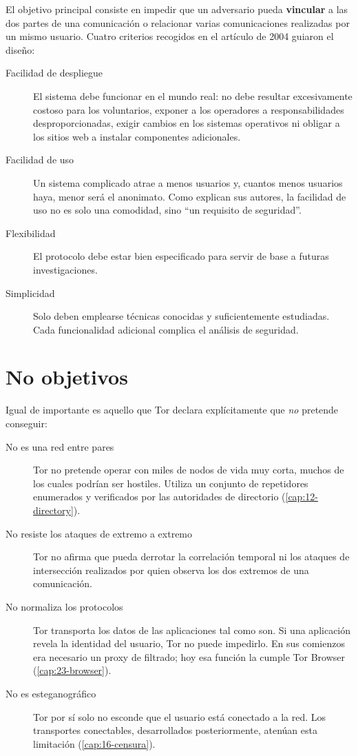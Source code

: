 El objetivo principal consiste en impedir que un adversario pueda \textbf{vincular} a las dos partes de una comunicación o relacionar varias comunicaciones realizadas por un mismo usuario. Cuatro criterios recogidos en el artículo de 2004 guiaron el diseño:
\begin{description}
  \item[Facilidad de despliegue] El sistema debe funcionar en el mundo real: no debe resultar excesivamente costoso para los voluntarios, exponer a los operadores a responsabilidades desproporcionadas, exigir cambios en los sistemas operativos ni obligar a los sitios web a instalar componentes adicionales.
  \item[Facilidad de uso] Un sistema complicado atrae a menos usuarios y, cuantos menos usuarios haya, menor será el anonimato. Como explican sus autores, la facilidad de uso no es solo una comodidad, sino \enquote{un requisito de seguridad}.
  \item[Flexibilidad] El protocolo debe estar bien especificado para servir de base a futuras investigaciones.
  \item[Simplicidad] Solo deben emplearse técnicas conocidas y suficientemente estudiadas. Cada funcionalidad adicional complica el análisis de seguridad.
\end{description}

\section{No objetivos}\label{sec:minaccia-nonobiettivi}

Igual de importante es aquello que Tor declara explícitamente que \emph{no} pretende conseguir:
\begin{description}
  \item[No es una red entre pares] Tor no pretende operar con miles de nodos de vida muy corta, muchos de los cuales podrían ser hostiles. Utiliza un conjunto de repetidores enumerados y verificados por las autoridades de directorio (\cref{cap:12-directory}).
  \item[No resiste los ataques de extremo a extremo] Tor no afirma que pueda derrotar la correlación temporal ni los ataques de intersección realizados por quien observa los dos extremos de una comunicación.
  \item[No normaliza los protocolos] Tor transporta los datos de las aplicaciones tal como son. Si una aplicación revela la identidad del usuario, Tor no puede impedirlo. En sus comienzos era necesario un proxy de filtrado; hoy esa función la cumple Tor Browser (\cref{cap:23-browser}).
  \item[No es esteganográfico] Tor por sí solo no esconde que el usuario está conectado a la red. Los transportes conectables, desarrollados posteriormente, atenúan esta limitación (\cref{cap:16-censura}).
\end{description}

